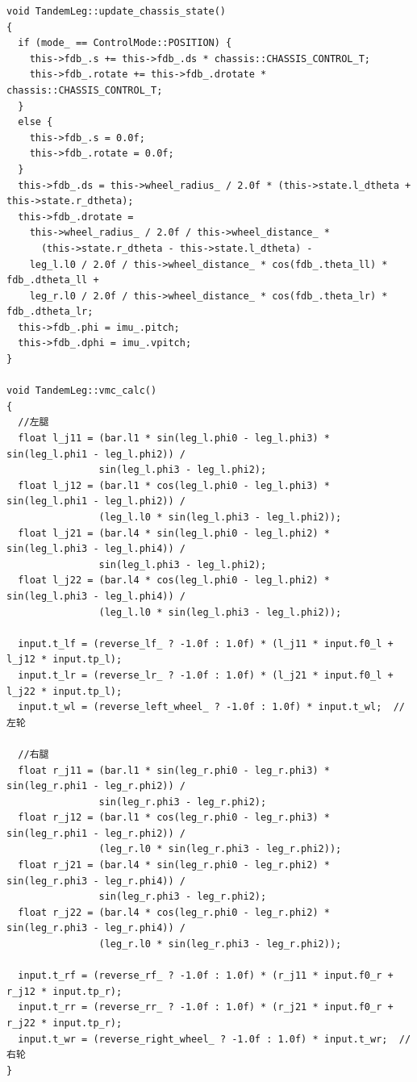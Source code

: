 \begin{verbatim}
void TandemLeg::update_chassis_state()
{
  if (mode_ == ControlMode::POSITION) {
    this->fdb_.s += this->fdb_.ds * chassis::CHASSIS_CONTROL_T;
    this->fdb_.rotate += this->fdb_.drotate * chassis::CHASSIS_CONTROL_T;
  }
  else {
    this->fdb_.s = 0.0f;
    this->fdb_.rotate = 0.0f;
  }
  this->fdb_.ds = this->wheel_radius_ / 2.0f * (this->state.l_dtheta + this->state.r_dtheta);
  this->fdb_.drotate =
    this->wheel_radius_ / 2.0f / this->wheel_distance_ *
      (this->state.r_dtheta - this->state.l_dtheta) -
    leg_l.l0 / 2.0f / this->wheel_distance_ * cos(fdb_.theta_ll) * fdb_.dtheta_ll +
    leg_r.l0 / 2.0f / this->wheel_distance_ * cos(fdb_.theta_lr) * fdb_.dtheta_lr;
  this->fdb_.phi = imu_.pitch;
  this->fdb_.dphi = imu_.vpitch;
}

void TandemLeg::vmc_calc()
{
  //左腿
  float l_j11 = (bar.l1 * sin(leg_l.phi0 - leg_l.phi3) * sin(leg_l.phi1 - leg_l.phi2)) /
                sin(leg_l.phi3 - leg_l.phi2);
  float l_j12 = (bar.l1 * cos(leg_l.phi0 - leg_l.phi3) * sin(leg_l.phi1 - leg_l.phi2)) /
                (leg_l.l0 * sin(leg_l.phi3 - leg_l.phi2));
  float l_j21 = (bar.l4 * sin(leg_l.phi0 - leg_l.phi2) * sin(leg_l.phi3 - leg_l.phi4)) /
                sin(leg_l.phi3 - leg_l.phi2);
  float l_j22 = (bar.l4 * cos(leg_l.phi0 - leg_l.phi2) * sin(leg_l.phi3 - leg_l.phi4)) /
                (leg_l.l0 * sin(leg_l.phi3 - leg_l.phi2));

  input.t_lf = (reverse_lf_ ? -1.0f : 1.0f) * (l_j11 * input.f0_l + l_j12 * input.tp_l);
  input.t_lr = (reverse_lr_ ? -1.0f : 1.0f) * (l_j21 * input.f0_l + l_j22 * input.tp_l);
  input.t_wl = (reverse_left_wheel_ ? -1.0f : 1.0f) * input.t_wl;  //左轮

  //右腿
  float r_j11 = (bar.l1 * sin(leg_r.phi0 - leg_r.phi3) * sin(leg_r.phi1 - leg_r.phi2)) /
                sin(leg_r.phi3 - leg_r.phi2);
  float r_j12 = (bar.l1 * cos(leg_r.phi0 - leg_r.phi3) * sin(leg_r.phi1 - leg_r.phi2)) /
                (leg_r.l0 * sin(leg_r.phi3 - leg_r.phi2));
  float r_j21 = (bar.l4 * sin(leg_r.phi0 - leg_r.phi2) * sin(leg_r.phi3 - leg_r.phi4)) /
                sin(leg_r.phi3 - leg_r.phi2);
  float r_j22 = (bar.l4 * cos(leg_r.phi0 - leg_r.phi2) * sin(leg_r.phi3 - leg_r.phi4)) /
                (leg_r.l0 * sin(leg_r.phi3 - leg_r.phi2));

  input.t_rf = (reverse_rf_ ? -1.0f : 1.0f) * (r_j11 * input.f0_r + r_j12 * input.tp_r);
  input.t_rr = (reverse_rr_ ? -1.0f : 1.0f) * (r_j21 * input.f0_r + r_j22 * input.tp_r);
  input.t_wr = (reverse_right_wheel_ ? -1.0f : 1.0f) * input.t_wr;  //右轮
}


\end{verbatim}
